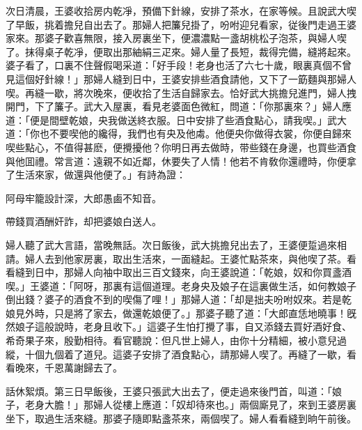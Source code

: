 次日清晨，王婆收拾房内乾凈，預備下針線，安排了茶水，在家等候。且說武大喫了早飯，挑着擔兒自出去了。那婦人把簾兒掛了，吩咐迎兒看家，従後門走過王婆家來。那婆子歡喜無限，接入房裏坐下，便濃濃點一盞胡桃松子泡茶，與婦人喫了。抹得桌子乾凈，便取出那紬絹三疋來。婦人量了長短，裁得完備，縫將起來。婆子看了，口裏不住聲假喝采道：「好手段！老身也活了六七十歲，眼裏真個不曾見這個好針線！」那婦人縫到日中，王婆安排些酒食請他，又下了一筯麵與那婦人喫。再縫一歇，將次晚來，便收拾了生活自歸家去。恰好武大挑擔兒進門，婦人拽開門，下了簾子。武大入屋裏，看見老婆面色微紅，問道：「你那裏來？」婦人應道：「便是間壁乾娘，央我做送終衣服。日中安排了些酒食點心，請我喫。」武大道：「你也不要喫他的纔得，我們也有央及他䖏。他便央你做得衣裳，你便自歸來喫些點心，不值得甚麽，便攪擾他？你明日再去做時，带些錢在身邊，也買些酒食與他囬禮。常言道：遠親不如近鄰，休要失了人情！他若不肯敎你還禮時，你便拿了生活來家，做還與他便了。」有詩為證：

阿母牢籠設計深，大郎愚鹵不知音。

帶錢買酒酬奸詐，却把婆娘白送人。

婦人聽了武大言語，當晚無話。次日飯後，武大挑擔兒出去了，王婆便踅過來相請。婦人去到他家房裏，取出生活來，一面縫起。王婆忙點茶來，與他喫了茶。看看縫到日中，那婦人向袖中取出三百文錢來，向王婆說道：「乾娘，奴和你買盞酒喫。」王婆道：「阿呀，那裏有這個道理。老身央及娘子在這裏做生活，如何教娘子倒出錢？婆子的酒食不到的喫傷了哩！」那婦人道：「却是拙夫吩咐奴來。若是乾娘見外時，只是將了家去，做還乾娘便了。」那婆子聽了道：「大郎直恁地曉事！旣然娘子這般說時，老身且收下。」這婆子生怕打攪了事，自又添錢去買好酒好食、希奇果子來，殷勤相待。看官聽說：但凡世上婦人，由你十分精細，被小意兒過縱，十個九個着了道兒。這婆子安排了酒食點心，請那婦人喫了。再縫了一歇，看看晚來，千恩萬謝歸去了。

話休絮煩。第三日早飯後，王婆只張武大出去了，便走過來後門首，叫道：「娘子，老身大膽！」那婦人從樓上應道：「奴却待來也。」兩個廝見了，來到王婆房裏坐下，取過生活來縫。那婆子隨即點盞茶來，兩個喫了。婦人看看縫到晌午前後。


